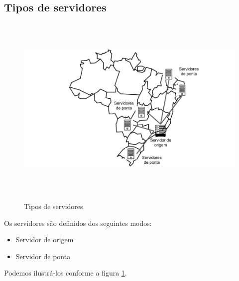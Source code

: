 \subsection{Tipos de servidores}

\begin{figure}[H]
\caption{Tipos de servidores}
\includegraphics[height=9cm]{Figuras/tipos_servidores.png} 
\label{figura:tipos_servidores} 
\end{figure}

Os servidores s\~ao definidos dos seguintes modos:
\begin{itemize}
	\item Servidor de origem
	\item Servidor de ponta
\end{itemize}

Podemos ilustr\'a-los conforme a figura \ref{figura:tipos_servidores}.
